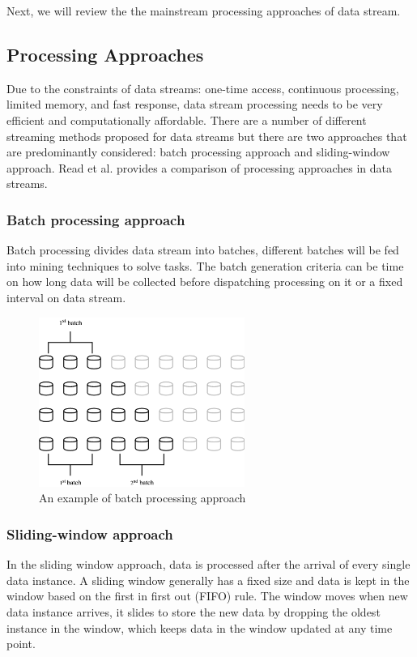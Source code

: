 Next, we will review the the mainstream processing approaches of data stream.

\subsection{Processing Approaches}
Due to the constraints of data streams: one-time access, continuous processing, limited memory, and fast response, data stream processing needs to be very efficient and computationally affordable. There are a number of different streaming methods proposed for data streams but there are two approaches that are predominantly considered: batch processing approach and sliding-window approach. Read et al. \cite{ds} provides a comparison of processing approaches in data streams.

\subsubsection{Batch processing approach}
Batch processing divides data stream into batches, different batches will be fed into mining techniques to solve tasks. The batch generation criteria can be time on how long data will be collected before dispatching processing on it or a fixed interval on data stream. 

\begin{figure}[H]
    \centering
    \includegraphics[width=0.6\textwidth]{RelatedWorks/batch.png}
    \caption{An example of batch processing approach}
    \label{fig:abrupt}
\end{figure}

\subsubsection{Sliding-window approach}
In the sliding window approach, data is processed after
the arrival of every single data instance. A sliding window generally has a fixed size and data is kept in the window based on the first in first out (FIFO) rule. The window moves when new data instance arrives, it slides to store the new data by dropping the oldest instance in the window, which keeps data in the window updated at any time point.

